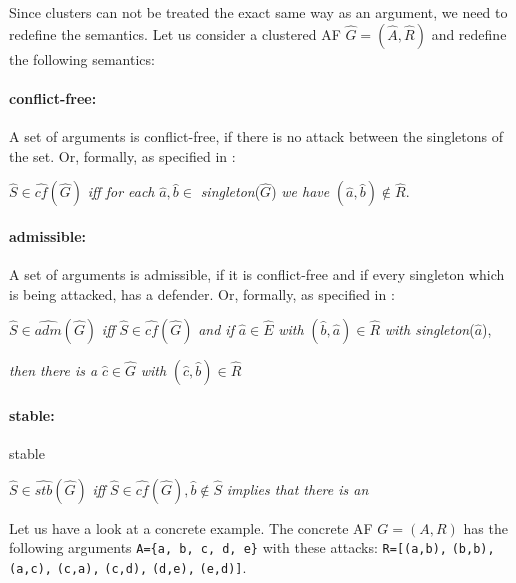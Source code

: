 Since clusters can not be treated the exact same way as an argument, we need to redefine the semantics. Let us consider a clustered AF $\hat{G}=(\hat{A}, \hat{R})$ and redefine the following semantics:
\paragraph{conflict-free:} A set of arguments is conflict-free, if there is no attack between the singletons of the set. Or, formally, as specified in \cite{DBLP:conf/kr/SaribaturW21}:

\begin{center}
$\hat{S} \in \hat{cf}(\hat{G})$ \textit{iff for each} $\hat{a}, \hat{b} \in$ \textit{singleton}($\hat{G}$) \textit{we have} $(\hat{a}, \hat{b}) \not\in \hat{R}$.
\end{center}

\paragraph{admissible:} A set of arguments is admissible, if it is conflict-free and if every singleton which is being attacked, has a defender. Or, formally, as specified in \cite{DBLP:conf/kr/SaribaturW21}:

\begin{center}
$\hat{S} \in \hat{adm}(\hat{G})$ \textit{iff} $\hat{S} \in \hat{cf}(\hat{G})$ \textit{and if} $\hat{a} \in \hat{E}$ \textit{with} $(\hat{b}, \hat{a}) \in \hat{R}$ \textit{with singleton}($\hat{a}$),

\textit{then there is a} $\hat{c} \in \hat{G}$ \textit{with} $(\hat{c}, \hat{b}) \in \hat{R}$
\end{center}

\paragraph{stable:} stable
\begin{center}
    $\hat{S} \in \hat{stb}(\hat{G})$ \textit{iff} $\hat{S} \in \hat{cf}(\hat{G}),  \hat{b} \not\in \hat{S}$ \textit{implies that there is an}
\end{center}





Let us have a look at a concrete example. The concrete AF $G = (A, R)$ has the following arguments \texttt{A=\{a, b, c, d, e\}} with these attacks:
\texttt{R=[(a,b),}
\texttt{(b,b),}
\texttt{(a,c),}
\texttt{(c,a),}
\texttt{(c,d),}
\texttt{(d,e),}
\texttt{(e,d)]}. 

